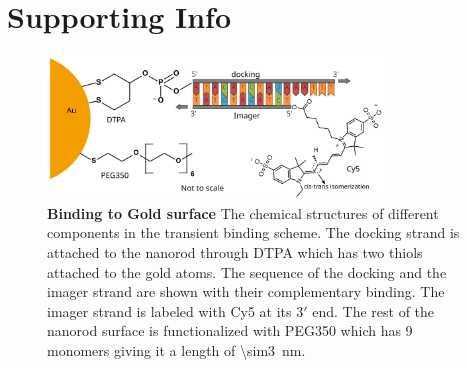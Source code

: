 \graphicspath{{chapters/c5_transient_binding/si-figures/}}
\section{Supporting Info}
\begin{figure}[ht]
  \centering
  \includegraphics[width=0.8\textwidth]{AuNR-SS_bonding}
  \makeatletter
  \renewcommand{\fnum@figure}{\figurename~S\thefigure}
  \makeatother
  \caption{\textbf{Binding to Gold surface} The chemical structures of different components in the transient binding scheme.
  The docking strand is attached to the nanorod through DTPA which has two thiols attached to the gold atoms.
  The sequence of the docking and the imager strand are shown with their complementary binding.
  The imager strand is labeled with Cy5 at its $3\prime$ end.
  The rest of the nanorod surface is functionalized with PEG350 which has 9 monomers giving it a length of \SI{\sim3}{\nm}.}
  \label{SIfig:AuNR-SS_bonding}
\end{figure}

